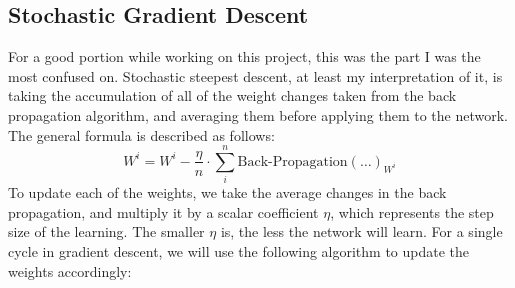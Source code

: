 \documentclass[10pt]{article}
\begin{document}
\subsection{Stochastic Gradient Descent}
For a good portion while working on this project, this was the part I was the most confused on. Stochastic steepest descent, at least my interpretation of it, is taking the accumulation of all of the weight changes taken from the back propagation algorithm, and averaging them before applying them to the network. The general formula is described as follows:
$$W^i = W^i  - \frac{\eta}{n} \cdot \sum_i^n{\text{Back-Propagation}(\ldots)_{W^i}} $$
To update each of the weights, we take the average changes in the back propagation, and multiply it by a scalar coefficient $\eta$, which represents the step size of the learning. The smaller $\eta$ is, the less the network will learn. For a single cycle in gradient descent, we will use the following algorithm to update the weights accordingly:\newline
\end{document}
